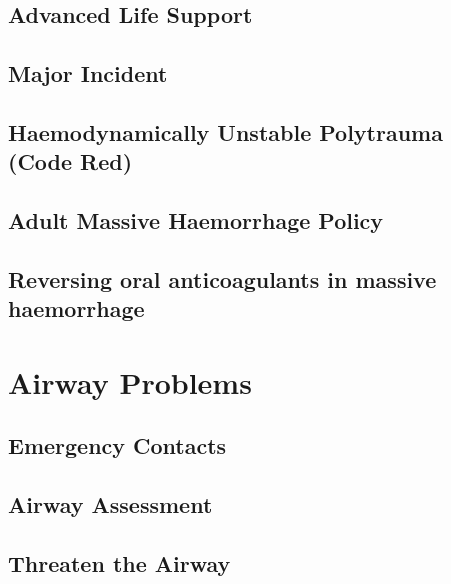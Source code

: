 \documentclass[]{book}
\begin{document}
\hypertarget{advanced-life-support}{%
\section{Advanced Life Support}\label{advanced-life-support}}

\hypertarget{major-incident}{%
\section{Major Incident}\label{major-incident}}

\hypertarget{haemodynamically-unstable-polytrauma-code-red}{%
\section{Haemodynamically Unstable Polytrauma (Code Red)}\label{haemodynamically-unstable-polytrauma-code-red}}

\hypertarget{adult-massive-haemorrhage-policy}{%
\section{Adult Massive Haemorrhage Policy}\label{adult-massive-haemorrhage-policy}}

\hypertarget{reversing-oral-anticoagulants-in-massive-haemorrhage}{%
\section{Reversing oral anticoagulants in massive haemorrhage}\label{reversing-oral-anticoagulants-in-massive-haemorrhage}}

\hypertarget{airprob}{%
\chapter{Airway Problems}\label{airprob}}

\hypertarget{emergency-contacts}{%
\section{Emergency Contacts}\label{emergency-contacts}}

\hypertarget{airway-assessment}{%
\section{Airway Assessment}\label{airway-assessment}}

\hypertarget{threaten-the-airway}{%
\section{Threaten the Airway}\label{threaten-the-airway}}
\end{document}
